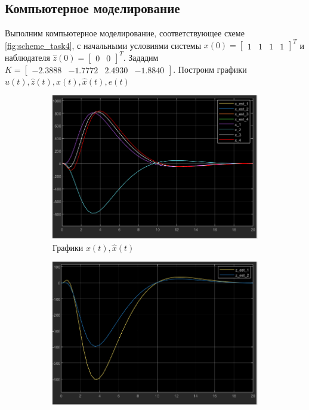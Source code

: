 \documentclass[a4paper, 12pt]{article}
\begin{document}
    \subsection{Компьютерное моделирование}
    Выполним компьютерное моделирование, соответствующее схеме \ref{fig:scheme_task4}, с начальными условиями системы
    $x(0)=\begin{bmatrix}
        1 &1 &1 &1
    \end{bmatrix}^T$ и наблюдателя $\hat{z}(0)=\begin{bmatrix}
        0 &0
    \end{bmatrix}^T$. Зададим $K=\begin{bmatrix}-2.3888   &-1.7772    &2.4930   &-1.8840\end{bmatrix}$. Построим графики $u(t),\hat{z}(t),x(t),\hat{x}(t),e(t)$
    \begin{figure}[H]
        \centering
        \begin{subfigure}{0.45\textwidth}
            \centering
            \includegraphics[width=\linewidth]{x_t_x_est_t_task4.png}
            \caption{Графики $x(t),\hat{x}(t)$}
            \label{fig:task_4_x_t}
        \end{subfigure}
        \hfill
        \begin{subfigure}{0.45\textwidth}
            \centering
            \includegraphics[width=\linewidth]{z_est_t_task4.png}

\end{subfigure}
\end{figure}
\end{document}
